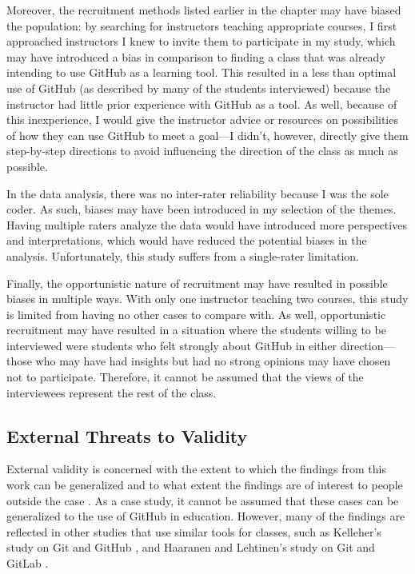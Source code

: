 Moreover, the recruitment methods listed earlier in the chapter may have biased the population: by searching for instructors teaching appropriate courses, I first approached instructors I knew to invite them to participate in my study, which may have introduced a bias in comparison to finding a class that was already intending to use GitHub as a learning tool. This resulted in a less than optimal use of GitHub (as described by many of the students interviewed) because the instructor had little prior experience with GitHub as a tool. As well, because of this inexperience, I would give the instructor advice or resources on possibilities of how they can use GitHub to meet a goal---I didn't, however, directly give them step-by-step directions to avoid influencing the direction of the class as much as possible.

In the data analysis, there was no inter-rater reliability because I was the sole coder. As such, biases may have been introduced in my selection of the themes. Having multiple raters analyze the data would have introduced more perspectives and interpretations, which would have reduced the potential biases in the analysis. Unfortunately, this study suffers from a single-rater limitation.

Finally, the opportunistic nature of recruitment may have resulted in possible biases in multiple ways. With only one instructor teaching two courses, this study is limited from having no other cases to compare with. As well, opportunistic recruitment may have resulted in a situation where the students willing to be interviewed were students who felt strongly about GitHub in either direction---those who may have had insights but had no strong opinions may have chosen not to participate. Therefore, it cannot be assumed that the views of the interviewees represent the rest of the class.

\subsection{External Threats to Validity}
External validity is concerned with the extent to which the findings from this work can be generalized and to what extent the findings are of interest to people outside the case \cite{runeson2012case}. As a case study, it cannot be assumed that these cases can be generalized to the use of GitHub in education. However, many of the findings are reflected in other studies that use similar tools for classes, such as Kelleher's study on Git and GitHub \cite{kelleher2014employing}, and Haaranen and Lehtinen's study on Git and GitLab \cite{haaranen2015teaching}. %

